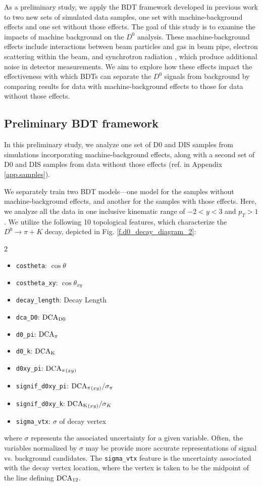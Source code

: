 As a preliminary study, we apply the BDT framework developed in previous work \cite{Shyam_ml} to two new sets of simulated data samples, one set with machine-background effects and one set without those effects. The goal of this study is to examine the impacts of machine background on the $D^0$ analysis. These machine-background effects include interactions between beam particles and gas in beam pipe, electron scattering within the beam, and synchrotron radiation \cite{eic_ptdr}, which produce additional noise in detector measurements. We aim to explore how these effects impact the effectiveness with which BDTs can separate the $D^0$ signals from background by comparing results for data with machine-background effects to those for data without those effects.

\subsection{Preliminary BDT framework}
\label{sec.results_prelim_methods}

In this preliminary study, we analyze one set of D0 and DIS samples from simulations incorporating machine-background effects, along with a second set of D0 and DIS samples from data without those effects (ref. in Appendix \ref{app.samples}).

We separately train two BDT models---one model for the samples without machine-background effects, and another for the samples with those effects. Here, we analyze all the data in one inclusive kinematic range of $-2<y<3$ and $p_T>1$. We utilize the following 10 topological features, which characterize the $D^0\rightarrow\pi+K$ decay, depicted in Fig. \ref{f.d0_decay_diagram_2}:
\begin{multicols}{2}
\begin{itemize}
    \item \texttt{costheta}: $\cos{\theta}$
    \item \texttt{costheta\_xy}: $\cos{\theta_{xy}}$
    \item \texttt{decay\_length}: Decay Length
    \item \texttt{dca\_D0}: $\rm DCA_{D0}$
    \item \texttt{d0\_pi}: $\rm DCA_\pi$
    \item \texttt{d0\_k}: $\rm DCA_K$
    \item \texttt{d0xy\_pi}: ${\rm DCA_\pi}_{(xy)}$
    \item \texttt{signif\_d0xy\_pi}: ${\rm DCA_\pi}_{(xy)}/\sigma_\pi$
    \item \texttt{signif\_d0xy\_k}: ${\rm DCA_K}_{(xy)}/\sigma_K$
    \item \texttt{sigma\_vtx}: $\sigma$ of decay vertex
\end{itemize}
\end{multicols}
where $\sigma$ represents the associated uncertainty for a given variable. Often, the variables normalized by $\sigma$ may be provide more accurate representations of signal vs. background candidates. The \texttt{sigma\_vtx} feature is the uncertainty associated with the decay vertex location, where the vertex is taken to be the midpoint of the line defining ${\rm DCA_{12}}$. 

